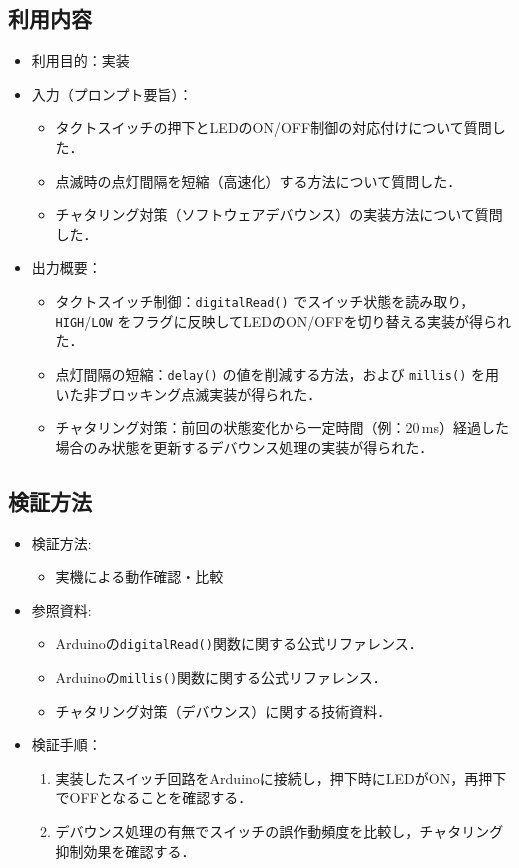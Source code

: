 \documentclass[lualatex,paper=a4paper,jafontsize=11.5pt,jafontscale=1.05]{jlreq}
\begin{document}
\subsection{利用内容}
\begin{itemize}
    \item 利用目的：実装
    \item 入力（プロンプト要旨）：
    \begin{itemize}
        \item タクトスイッチの押下とLEDのON/OFF制御の対応付けについて質問した．
        \item 点滅時の点灯間隔を短縮（高速化）する方法について質問した．
        \item チャタリング対策（ソフトウェアデバウンス）の実装方法について質問した．
    \end{itemize}
    \item 出力概要：
    \begin{itemize}
        \item タクトスイッチ制御：\texttt{digitalRead()} でスイッチ状態を読み取り，\texttt{HIGH}/\texttt{LOW} をフラグに反映してLEDのON/OFFを切り替える実装が得られた．
        \item 点灯間隔の短縮：\texttt{delay()} の値を削減する方法，および \texttt{millis()} を用いた非ブロッキング点滅実装が得られた．
        \item チャタリング対策：前回の状態変化から一定時間（例：20\,ms）経過した場合のみ状態を更新するデバウンス処理の実装が得られた．
    \end{itemize}
\end{itemize}

\subsection{検証方法}
\begin{itemize}
  \item 検証方法:
  \begin{itemize}
      \item 実機による動作確認・比較
  \end{itemize}
  \item 参照資料:
  \begin{itemize}
      \item Arduinoの\texttt{digitalRead()}関数に関する公式リファレンス\cite{digitalread}．
      \item Arduinoの\texttt{millis()}関数に関する公式リファレンス\cite{millis}．
      \item チャタリング対策（デバウンス）に関する技術資料\cite{debounce}．
  \end{itemize}
  \item 検証手順：
  \begin{enumerate}
      \item 実装したスイッチ回路をArduinoに接続し，押下時にLEDがON，再押下でOFFとなることを確認する．
      \item デバウンス処理の有無でスイッチの誤作動頻度を比較し，チャタリング抑制効果を確認する．
  \end{enumerate}
\end{itemize}
\end{document}
